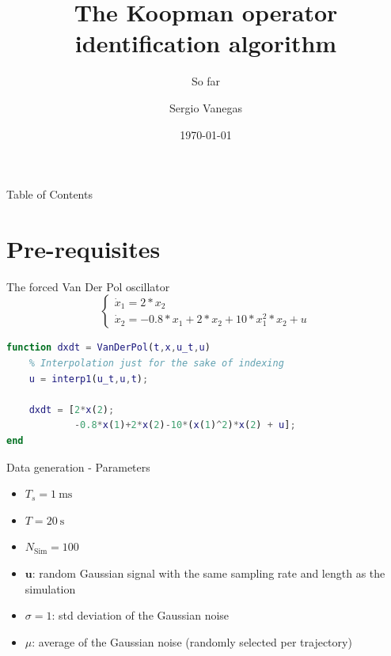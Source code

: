 \documentclass{beamer}
\title[Process]{The Koopman operator identification algorithm}
\subtitle{So far}
\institute[Polimi]{Politecnico di Milano}
\author{Sergio Vanegas}
\date{\today}
\begin{document}
\begin{frame}
    \maketitle
\end{frame}

\begin{frame}{Table of Contents}
    \tableofcontents
\end{frame}
    


\section{Pre-requisites}

\begin{frame}[fragile]{The forced Van Der Pol oscillator}
    \begin{equation}
        \begin{cases}
            \dot{x}_1 = 2*x_2 \\
            \dot{x}_2 = -0.8*x_1 + 2*x_2 + 10*x_1^2*x_2 + u
        \end{cases}
    \end{equation}

    \begin{lstlisting}[language=Matlab]
function dxdt = VanDerPol(t,x,u_t,u)
    % Interpolation just for the sake of indexing
    u = interp1(u_t,u,t);

    dxdt = [2*x(2);
            -0.8*x(1)+2*x(2)-10*(x(1)^2)*x(2) + u];
end
    \end{lstlisting}
\end{frame}

\begin{frame}{Data generation - Parameters}
    \begin{itemize}
        \item $T_s = \SI{1}{\milli \second}$
        \item $T = \SI{20}{\second}$
        \item $N_\text{Sim} = \num{100}$
        \item $\textbf{u}$: random Gaussian signal with the same sampling rate and length as the simulation
        \item $\sigma = 1$: std deviation of the Gaussian noise
        \item $\mu$: average of the Gaussian noise (randomly selected per trajectory)
    \end{itemize}
\end{frame}
\end{document}
